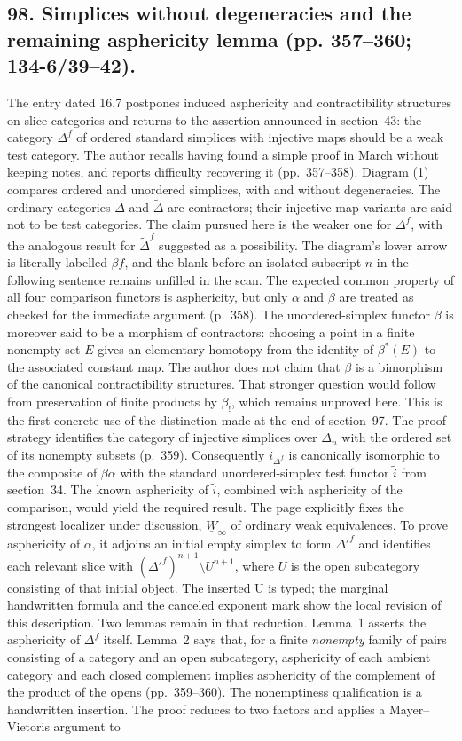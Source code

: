 \documentclass[10pt,oneside]{book}
\begin{document}
\subsection*{98. Simplices without degeneracies and the remaining asphericity lemma (pp. 357--360; 134-6/39--42).}
The entry dated 16.7 postpones induced asphericity and contractibility structures on slice categories and returns to the assertion announced in section~43: the category $\Delta^f$ of ordered standard simplices with injective maps should be a weak test category. The author recalls having found a simple proof in March without keeping notes, and reports difficulty recovering it (pp.~357--358). Diagram (1) compares ordered and unordered simplices, with and without degeneracies. The ordinary categories $\Delta$ and $\widetilde\Delta$ are contractors; their injective-map variants are said not to be test categories. The claim pursued here is the weaker one for $\Delta^f$, with the analogous result for $\widetilde\Delta^f$ suggested as a possibility. The diagram's lower arrow is literally labelled $\beta f$, and the blank before an isolated subscript $n$ in the following sentence remains unfilled in the scan. The expected common property of all four comparison functors is asphericity, but only $\alpha$ and $\beta$ are treated as checked for the immediate argument (p.~358). The unordered-simplex functor $\beta$ is moreover said to be a morphism of contractors: choosing a point in a finite nonempty set $E$ gives an elementary homotopy from the identity of $\beta^*(E)$ to the associated constant map. The author does not claim that $\beta$ is a bimorphism of the canonical contractibility structures. That stronger question would follow from preservation of finite products by $\beta_!$, which remains unproved here. This is the first concrete use of the distinction made at the end of section~97. The proof strategy identifies the category of injective simplices over $\Delta_n$ with the ordered set of its nonempty subsets (p.~359). Consequently $i_{\Delta^f}$ is canonically isomorphic to the composite of $\beta\alpha$ with the standard unordered-simplex test functor $\widetilde i$ from section~34. The known asphericity of $\widetilde i$, combined with asphericity of the comparison, would yield the required result. The page explicitly fixes the strongest localizer under discussion, $\underline W_{\infty}$ of ordinary weak equivalences. To prove asphericity of $\alpha$, it adjoins an initial empty simplex to form $\Delta'^f$ and identifies each relevant slice with $(\Delta'^f)^{n+1}\setminus U^{n+1}$, where $U$ is the open subcategory consisting of that initial object. The inserted U is typed; the marginal handwritten formula and the canceled exponent mark show the local revision of this description. Two lemmas remain in that reduction. Lemma~1 asserts the asphericity of $\Delta^f$ itself. Lemma~2 says that, for a finite \emph{nonempty} family of pairs consisting of a category and an open subcategory, asphericity of each ambient category and each closed complement implies asphericity of the complement of the product of the opens (pp.~359--360). The nonemptiness qualification is a handwritten insertion. The proof reduces to two factors and applies a Mayer--Vietoris argument to 
\end{document}
